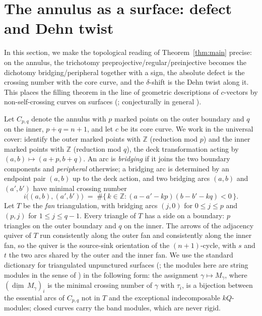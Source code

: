 \documentclass[11pt, a4paper]{amsart}
\theoremstyle{definition}
\newcommand{\ZZ}{\mathbb{Z}}
\begin{document}
\section{The annulus as a surface: defect and Dehn twist}
\label{sec:surface}

In this section, we make the topological reading of Theorem~\ref{thm:main}
precise: on the annulus, the trichotomy
preprojective/regular/preinjective becomes the dichotomy
bridging/peripheral together with a sign, the absolute defect is the
crossing number with the core curve, and the $\delta$-shift is the Dehn twist along
it. This places the filling theorem in the line of geometric descriptions
of $c$-vectors by non-self-crossing curves on surfaces
\textup{(}\cite{FominShapiroThurston2008, Hong2021}; conjecturally in
general \cite{LeeLeeMills2019}\textup{)}.

Let $C_{p, q}$ denote the annulus with $p$ marked points on the outer
boundary and $q$ on the inner, $p + q = n + 1$, and let $c$ be its core
curve. We work in the universal cover: identify the outer marked points
with $\ZZ$ \textup{(}reduction mod $p$\textup{)} and the inner marked
points with $\ZZ$ \textup{(}reduction mod $q$\textup{)}, the deck
transformation acting by $(a, b) \mapsto (a + p, b + q)$. An arc is
\emph{bridging} if it joins the two boundary components and
\emph{peripheral} otherwise; a bridging arc is determined by an endpoint
pair $(a, b)$ up to the deck action, and two bridging arcs $(a, b)$ and
$(a', b')$ have minimal crossing number
\[
  i\bigl((a, b), (a', b')\bigr)
  \;=\; \#\{\, k \in \ZZ : (a - a' - kp)(b - b' - kq) < 0 \,\}.
\]
Let $T$ be the \emph{fan} triangulation, with bridging arcs $(j, 0)$ for
$0 \leq j \leq p$ and $(p, j)$ for $1 \leq j \leq q - 1$. Every triangle
of $T$ has a side on a boundary: $p$ triangles on the outer boundary and
$q$ on the inner. The arrows of the adjacency quiver of $T$ run
consistently along the outer fan and consistently along the inner fan, so
the quiver is the source-sink orientation of the $(n+1)$-cycle, with $s$
and $t$ the two arcs shared by the outer and the inner fan. We use the
standard dictionary for triangulated unpunctured surfaces
\textup{(}\cite{FominShapiroThurston2008, ABCP2010, BrustleZhang2011}; the
modules here are string modules in the sense of
\cite{ButlerRingel1987}\textup{)} in the
following form: the assignment $\gamma \mapsto M_\gamma$, where
$(\underline{\dim}\, M_\gamma)_i$ is the minimal crossing number of
$\gamma$ with $\tau_i$, is a bijection between the essential arcs of
$C_{p, q}$ not in $T$ and the exceptional indecomposable $kQ$-modules;
closed curves carry the band modules, which are never rigid.
\end{document}

